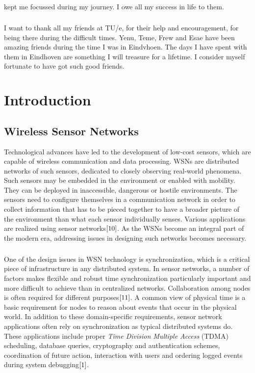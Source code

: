 \documentclass[a4paper,10pt]{report}
\begin{document}
kept me focussed during my journey. I owe all my success in life to them. \paragraph*{} \paragraph*{}  I want to thank all my friends at TU/e, for their help and encouragement, for being there during the difficult times. Yenu, Teme, Frew and Esae have been amazing friends during the time I was in Eindvhoen. The days I have spent with them in Eindhoven are something I will treasure for a lifetime. I consider myself fortunate to have got such good friends.
\newpage
{}
\tableofcontents
{}
\listoffigures
{}
\printnomenclature[3.5cm]
\chapter{\textbf{Introduction}}
\section{\textbf{Wireless Sensor Networks}}\par
Technological advances have led to the development of low-cost sensors, which are capable of wireless communication and
data processing. WSNs are distributed networks of such sensors, dedicated to closely observing
real-world phenomena. Such sensors may be embedded in the environment or enabled with mobility. They can be deployed in
inaccessible, dangerous or hostile environments. The sensors need to configure themselves in a communication network in order to collect
information that has to be pieced together to have a broader picture of the environment than what each sensor individually
senses. Various applications are realized using sensor networks$\cite{10}$. As the WSNs become an integral part of the modern era, addressing issues in designing such networks becomes necessary.
\paragraph*{} One of the design issues in WSN technology is synchronization, which is a critical piece of infrastructure in any
distributed system. In sensor networks, a number of factors makes flexible and robust time synchronization particularly important and
more difficult to achieve than in centralized networks.
Collaboration among nodes is often required for different purposes$\cite{11}$. A common view of physical time is a basic requirement for nodes to reason about events that occur in the physical world. In addition to these domain-specific requirements, sensor network applications often rely on synchronization as typical distributed systems do. These applications include proper \textit{Time Division Multiple Access} (TDMA) scheduling, database queries, cryptography and authentication schemes, coordination of future action, interaction with users and ordering logged events during system debugging$\cite{1}$.
\end{document}
